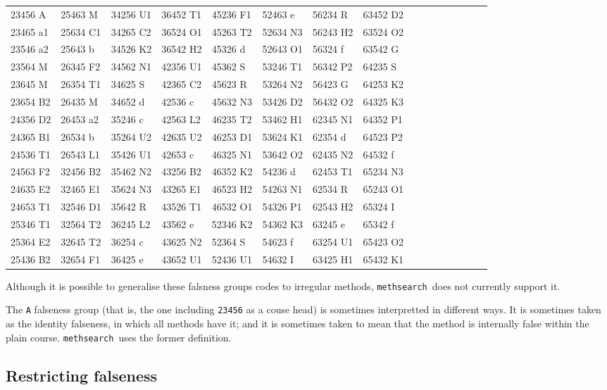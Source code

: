 \documentclass[a4paper,11pt,oneside]{book}
\def\methsearch{\texttt{meth\-search}}
\begin{document}
{\tt\tiny\begin{center}\begin{tabular}{ll ll ll ll ll ll ll ll}
23456 A&25463 M&34256 U1&36452 T1&45236 F1&52463 e&56234 R&63452 D2\\
23465 a1&25634 C1&34265 C2&36524 O1&45263 T2&52634 N3&56243 H2&63524 O2\\
23546 a2&25643 b&34526 K2&36542 H2&45326 d&52643 O1&56324 f&63542 G\\
23564 M&26345 F2&34562 N1&42356 U1&45362 S&53246 T1&56342 P2&64235 S\\
23645 M&26354 T1&34625 S&42365 C2&45623 R&53264 N2&56423 G&64253 K2\\
23654 B2&26435 M&34652 d&42536 c&45632 N3&53426 D2&56432 O2&64325 K3\\
24356 D2&26453 a2&35246 c&42563 L2&46235 T2&53462 H1&62345 N1&64352 P1\\
24365 B1&26534 b&35264 U2&42635 U2&46253 D1&53624 K1&62354 d&64523 P2\\
24536 T1&26543 L1&35426 U1&42653 c&46325 N1&53642 O2&62435 N2&64532 f\\
24563 F2&32456 B2&35462 N2&43256 B2&46352 K2&54236 d&62453 T1&65234 N3\\
24635 E2&32465 E1&35624 N3&43265 E1&46523 H2&54263 N1&62534 R&65243 O1\\
24653 T1&32546 D1&35642 R&43526 T1&46532 O1&54326 P1&62543 H2&65324 I\\
25346 T1&32564 T2&36245 L2&43562 e&52346 K2&54362 K3&63245 e&65342 f\\
25364 E2&32645 T2&36254 c&43625 N2&52364 S&54623 f&63254 U1&65423 O2\\
25436 B2&32654 F1&36425 e&43652 U1&52436 U1&54632 I&63425 H1&65432 K1\\
\end{tabular}\end{center}}

Although it is possible to generalise these falsness groups codes to 
irregular methods, \methsearch\ does not currently support it.

The \verb+A+ falseness group (that is, the one including \verb+23456+ as a
couse head) is sometimes interpretted in different ways.%
  It is sometimes
taken as the identity falseness, in which all methods have it; and it 
is sometimes taken to mean that the method is internally false within the
plain course.  \methsearch\ uses the former definition.

\subsection{Restricting falseness}
\end{document}
